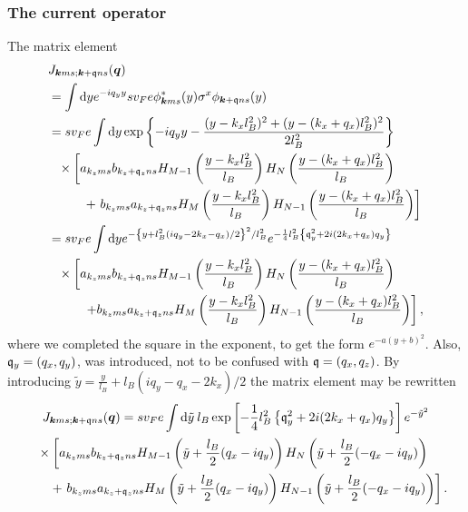 \subsubsection{The current operator}
The matrix element
\begin{align}
  &J_{\vec{k}ms; \vec{k}+\qvec{q} ns}(\vec{q})\nonumber\\
  &=  \int \mathrm{d}y
    e^{-iq_yy} sv_Fe \phi ^{*}_{\vec{k} ms}(y)
    \sigma ^x
    \phi _{\vec{k} +\qvec{q} ns}(y)\\
  &= s v_F e \int \mathrm{d}y
    \exp \left\{
    - i q_yy - \frac{(y-k_xl_B^2)^2 + (y-(k_x + q_x) l_B^2)^2}{2 l_B^2}
    \right\}\\
  \nonumber &\pe \times \left[
    a_{k_zms}b_{k_z + \qvec{q}_z ns} H_{M-1} \left( \frac{y - k_xl_B^2}{l_B} \right) H_N\left( \frac{y - (k_x + q_x) l_B^2}{l_B} \right)\right.\\
  \nonumber &\pe\quad\quad +
    \left.  b_{k_zms} a_{k_z + \qvec{q}_z ns}
    H_M \left( \frac{y - k_xl_B^2}{l_B} \right)
    H_{N-1} \left( \frac{y - (k_x+ q_x) l_B^2}{l_B} \right)
    \right]\\
  &= s v_F e \int \mathrm{d}y
    e^{-\left\{
    y+ l_B^2 \left( iq_y - 2k_x - q_x \right) /2
      \right\}^2 /l_B^2 }
    e^{- \frac{1}{4} l_B^2 \left\{
    \qvec{q}_y^2 + 2 i (2k_x + q_x) q_y
    \right\}} \\
  \nonumber &\pe \times \left[
    a_{k_zms}b_{k_z + \qvec{q}_z ns} H_{M-1} \left( \frac{y - k_xl_B^2}{l_B} \right) H_N\left( \frac{y - (k_x + q_x) l_B^2}{l_B} \right) \right.\\
  \nonumber &\pe \quad\quad \left. +
    b_{k_zms} a_{k_z + \qvec{q}_z ns}
    H_M \left( \frac{y - k_xl_B^2}{l_B} \right)
    H_{N-1} \left( \frac{y - (k_x + q_x) l_B^2}{l_B} \right)
    \right],
\end{align}
where we completed the square in the exponent, to get the form $e^{-a(y + b)^2}$.
Also, $\mathfrak{q}_y=(q_x, q_y)$, was introduced, not to be confused with $\mathfrak{q} = (q_x, q_z)$.
By introducing $\tilde{y} = \frac{y}{l_{B}} + l_B(iq_y - q_x - 2 k_x) / 2$ the matrix element may be rewritten
\begin{multline}
  \label{eq:73}
    J_{\bm{k}ms; \bm{k}+\mathfrak{q} ns}(\bm{q}) =
    s v_F e \int \mathrm{d}\tilde{y} \: l_B
\exp \left[- \frac{1}{4} l_B^2 \left\{
    \mathfrak{q}_y^2 + 2 i (2k_x + q_x) q_y 
  \right\}\right]
  e^{-\tilde{y}^2}\\
  \quad\begin{split}
   &\times\left[
    a_{k_zms}b_{k_z + \mathfrak{q}_z ns}
    H_{M-1} \left( \tilde{y} + \frac{l_B}{2}(q_x - iq_y) \right)
    H_N\left( \tilde{y} + \frac{l_B}{2}(-q_x - iq_y) \right) \right.\\
    &\quad +\left.
    b_{k_zms} a_{k_z + \mathfrak{q}_z ns}
    H_M \left( \tilde{y} + \frac{l_B}{2}(q_x - iq_y) \right)
    H_{N-1} \left( \tilde{y} +  \frac{l_B}{2}(-q_x - iq_y)\right)
    \right].
  \end{split}
\end{multline}
